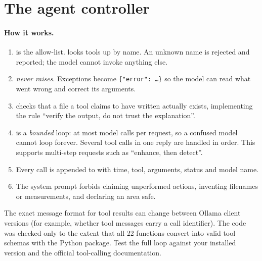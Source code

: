 \section{The agent controller}


\paragraph{How it works.}
\begin{enumerate}
  \item {} is the allow-list.  looks tools up by name. An unknown name is rejected and reported; the model cannot invoke anything else.
  \item {} \emph{never raises}. Exceptions become \texttt{\{"error": \ldots\}} so the model can read what went wrong and correct its arguments.
  \item {} checks that a file a tool claims to have written actually exists, implementing the rule ``verify the output, do not trust the explanation''.
  \item {} is a \emph{bounded} loop: at most  model calls per request, so a confused model cannot loop forever. Several tool calls in one reply are handled in order. This supports multi-step requests such as ``enhance, then detect''.
  \item Every call is appended to  with time, tool, arguments, status and model name.
  \item The system prompt forbids claiming unperformed actions, inventing filenames or measurements, and declaring an area safe.
\end{enumerate}
\begin{notebox}
The exact message format for tool results can change between Ollama client versions (for example, whether tool messages carry a call identifier). The code was checked only to the extent that all 22 functions convert into valid tool schemas with the  Python package. Test the full loop against your installed version and the official tool-calling documentation.
\end{notebox}

